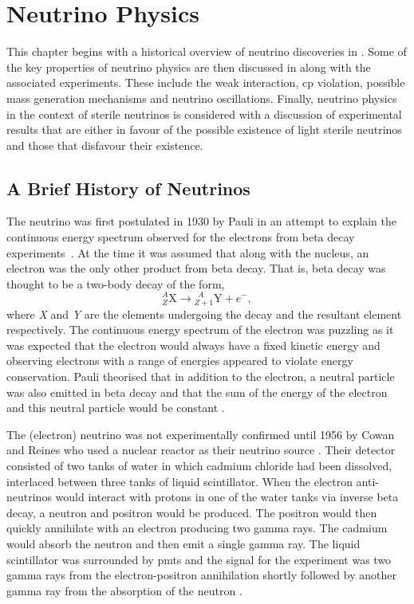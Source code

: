 \chapter{Neutrino Physics}
\label{chap:Neutrino Physics}

This chapter begins with a historical overview of neutrino discoveries in . Some of the key properties of neutrino physics are then discussed in  along with the associated experiments. These include the weak interaction, \gls{cp} violation, possible mass generation mechanisms and neutrino oscillations. Finally, neutrino physics in the context of sterile neutrinos is considered with a discussion of experimental results that are either in favour of the possible existence of light sterile neutrinos and those that disfavour their existence. 

\section{A Brief History of Neutrinos}\label{sec:history_of_neutrino_flavours}

The neutrino was first postulated in 1930 by Pauli in an attempt to explain the continuous energy spectrum observed for the electrons from beta decay experiments~\cite{Pauli_letter}. At the time it was assumed that along with the nucleus, an electron was the only other product from beta decay. That is, beta decay was thought to be a two-body decay of the form,
\begin{equation}
    {^A_Z}\text{X} \longrightarrow {^{\ \ A}_{Z+1}}\text{Y} + e^-,
\end{equation}
where \textit{X} and \textit{Y} are the elements undergoing the decay and the resultant element respectively. The continuous energy spectrum of the electron was puzzling as it was expected that the electron would always have a fixed kinetic energy and observing electrons with a range of energies appeared to violate energy conservation. Pauli theorised that in addition to the electron, a neutral particle was also emitted in beta decay and that the sum of the energy of the electron and this neutral particle would be constant \cite{Pauli_letter}.

The (electron) neutrino was not experimentally confirmed until 1956 by Cowan and Reines who used a nuclear reactor as their neutrino source \cite{cowan_and_reines_paper}. Their detector consisted of two tanks of water in which cadmium chloride had been dissolved, interlaced between three tanks of liquid scintillator. When the electron anti-neutrinos would interact with protons in one of the water tanks via inverse beta decay, a neutron and positron would be produced. The positron would then quickly annihilate with an electron producing two gamma rays. The cadmium would absorb the neutron and then emit a single gamma ray. The liquid scintillator was surrounded by \Glspl{pmt} and the signal for the experiment was two gamma rays from the electron-positron annihilation shortly followed by another gamma ray from the absorption of the neutron \cite{cowan_and_reines_paper}.

